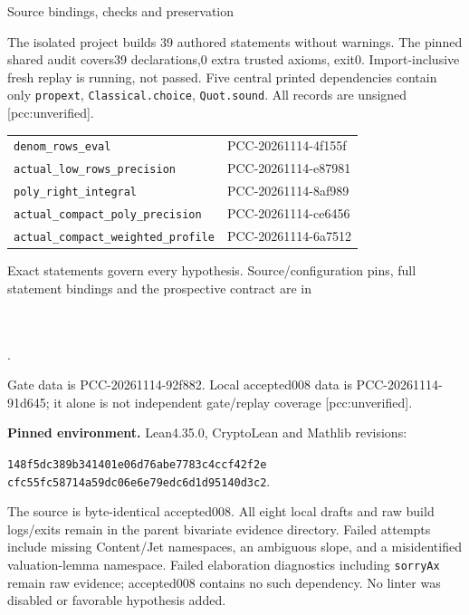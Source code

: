 \documentclass[10pt]{article}
\begin{document}
\newpage
\begin{center}{\Large Source bindings, checks and preservation}\end{center}
The isolated project builds 39 authored statements without warnings.
The pinned shared audit covers39 declarations,0 extra trusted axioms,
exit0. Import-inclusive fresh replay is running, not passed. Five central
printed dependencies contain only \texttt{propext}, \texttt{Classical.choice},
\texttt{Quot.sound}. All records are unsigned [pcc:unverified].

\begin{center}\small
\begin{tabular}{p{.63\linewidth}p{.26\linewidth}}
\texttt{denom\_rows\_eval}&PCC-20261114-4f155f\\
\texttt{actual\_low\_rows\_precision}&PCC-20261114-e87981\\
\texttt{poly\_right\_integral}&PCC-20261114-8af989\\
\texttt{actual\_compact\_poly\_precision}&PCC-20261114-ce6456\\
\texttt{actual\_compact\_weighted\_profile}&PCC-20261114-6a7512
\end{tabular}
\end{center}
Exact statements govern every hypothesis. Source/configuration pins, full
statement bindings and the prospective contract are in
\begin{center}\small
{}\\
\\
.
\end{center}
Gate data is PCC-20261114-92f882. Local accepted008 data is
PCC-20261114-91d645; it alone is not independent
gate/replay coverage [pcc:unverified].

\textbf{Pinned environment.} Lean4.35.0, CryptoLean and Mathlib revisions:
\begin{center}\small
\texttt{148f5dc389b341401e06d76abe7783c4ccf42f2e}\\
\texttt{cfc55fc58714a59dc06e6e79edc6d1d95140d3c2}.
\end{center}
The source is byte-identical accepted008. All eight local drafts and raw
build logs/exits remain in the parent bivariate evidence directory.
Failed attempts include missing Content/Jet namespaces, an ambiguous slope,
and a misidentified valuation-lemma namespace. Failed elaboration diagnostics
including \texttt{sorryAx} remain raw evidence; accepted008 contains no such
dependency. No linter was disabled or favorable hypothesis added.
\end{document}
